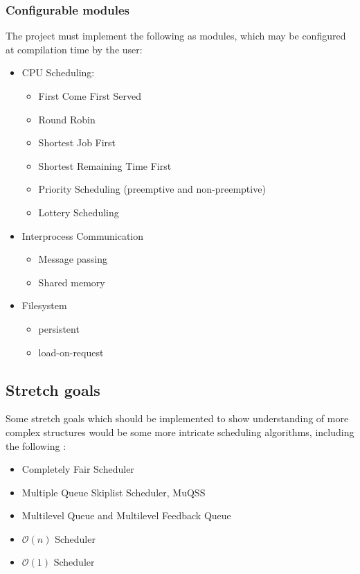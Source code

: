 \documentclass[10pt,a4paper]{article}
\begin{document}
\subsubsection*{Configurable modules}
The project must implement the following as modules, which may be configured at
compilation time by the user:
\begin{itemize}
    \item CPU Scheduling:
        \begin{itemize}
            \item First Come First Served
            \item Round Robin
            \item Shortest Job First
            \item Shortest Remaining Time First
            \item Priority Scheduling (preemptive and non-preemptive)
            \item Lottery Scheduling
        \end{itemize}
    \item Interprocess Communication
        \begin{itemize}
            \item Message passing
            \item Shared memory
        \end{itemize}
    \item Filesystem
        \begin{itemize}
            \item persistent
            \item load-on-request
        \end{itemize}
\end{itemize}

\subsection*{Stretch goals}
Some stretch goals which should be implemented to show understanding of more
complex structures would be some more intricate scheduling algorithms, including
the following \cite{CFS,BFS,DinosaurCPU,Schedulers}:
\begin{itemize}
    \itemsep0em 
    \item Completely Fair Scheduler
    \item Multiple Queue Skiplist Scheduler, MuQSS
    \item Multilevel Queue and Multilevel Feedback Queue
    \item $\mathcal{O}(n)$ Scheduler
    \item $\mathcal{O}(1)$ Scheduler
\end{itemize}
\end{document}
